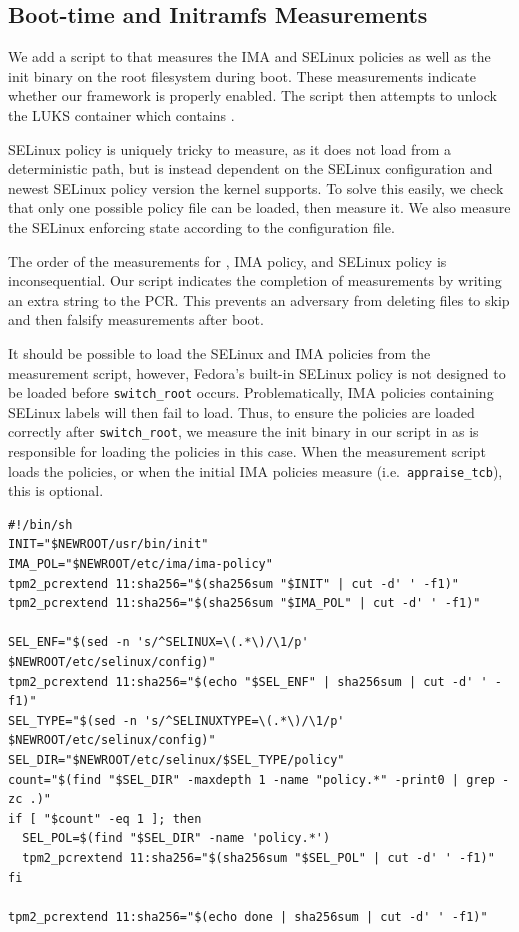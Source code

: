 \documentclass[12pt,letterpaper]{kuthesis}
\begin{document}
\subsection{Boot-time and Initramfs Measurements}\label{sec:script}
We add a script to \initramfs that measures the IMA and SELinux policies
as well as the \systemd init binary on the root filesystem during boot.
These measurements indicate whether our framework is properly enabled.
The script then attempts to unlock the LUKS container which contains \wcp.

SELinux policy is uniquely tricky to measure,
as it does not load from a deterministic path, but is instead dependent on the SELinux configuration and newest SELinux policy version the kernel supports.
To solve this easily, we check that only one possible policy file can be loaded, then measure it.
We also measure the SELinux enforcing state according to the configuration file.

The order of the measurements for \systemd, IMA policy, and SELinux policy is inconsequential.
Our script indicates the completion of measurements by writing an extra string to the PCR.
This prevents an adversary from deleting files to skip and then falsify measurements after boot.

It should be possible to load the SELinux and IMA policies from the measurement script,
however, Fedora's built-in SELinux policy is not designed to be loaded before \verb|switch_root| occurs. 
Problematically, IMA policies containing SELinux labels will then fail to load.
Thus, to ensure the policies are loaded correctly after \verb|switch_root|, we measure the \systemd init binary in our \initramfs script in  as \systemd is responsible for loading the policies in this case.
When the measurement script loads the policies, or when the initial IMA policies
measure \systemd (i.e.\ \verb|appraise_tcb|), this is optional.

\begin{lstlisting}[style=bash]
#!/bin/sh
INIT="$NEWROOT/usr/bin/init"
IMA_POL="$NEWROOT/etc/ima/ima-policy"
tpm2_pcrextend 11:sha256="$(sha256sum "$INIT" | cut -d' ' -f1)"
tpm2_pcrextend 11:sha256="$(sha256sum "$IMA_POL" | cut -d' ' -f1)"

SEL_ENF="$(sed -n 's/^SELINUX=\(.*\)/\1/p' $NEWROOT/etc/selinux/config)"
tpm2_pcrextend 11:sha256="$(echo "$SEL_ENF" | sha256sum | cut -d' ' -f1)"
SEL_TYPE="$(sed -n 's/^SELINUXTYPE=\(.*\)/\1/p' $NEWROOT/etc/selinux/config)"
SEL_DIR="$NEWROOT/etc/selinux/$SEL_TYPE/policy"
count="$(find "$SEL_DIR" -maxdepth 1 -name "policy.*" -print0 | grep -zc .)"
if [ "$count" -eq 1 ]; then
  SEL_POL=$(find "$SEL_DIR" -name 'policy.*')
  tpm2_pcrextend 11:sha256="$(sha256sum "$SEL_POL" | cut -d' ' -f1)"
fi

tpm2_pcrextend 11:sha256="$(echo done | sha256sum | cut -d' ' -f1)"
\end{lstlisting}
\end{document}
